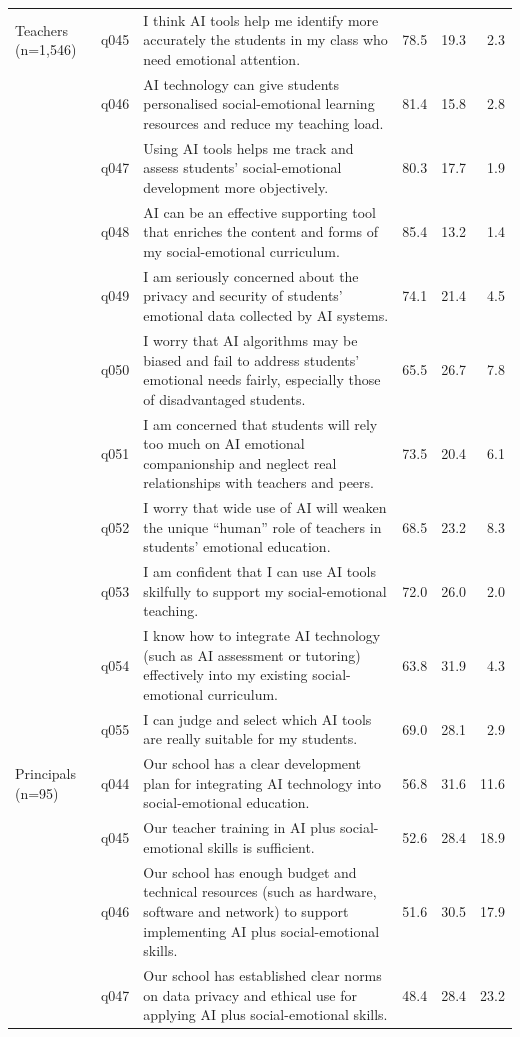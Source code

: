 \begin{longtable}{@{}p{}l p{} rrr@{}}
Teachers (n=1,546) & q045 & I think AI tools help me identify more accurately the students in my class who need emotional attention. & 78.5 & 19.3 & 2.3 \\
 & q046 & AI technology can give students personalised social-emotional learning resources and reduce my teaching load. & 81.4 & 15.8 & 2.8 \\
 & q047 & Using AI tools helps me track and assess students' social-emotional development more objectively. & 80.3 & 17.7 & 1.9 \\
 & q048 & AI can be an effective supporting tool that enriches the content and forms of my social-emotional curriculum. & 85.4 & 13.2 & 1.4 \\
 & q049 & I am seriously concerned about the privacy and security of students' emotional data collected by AI systems. & 74.1 & 21.4 & 4.5 \\
 & q050 & I worry that AI algorithms may be biased and fail to address students' emotional needs fairly, especially those of disadvantaged students. & 65.5 & 26.7 & 7.8 \\
 & q051 & I am concerned that students will rely too much on AI emotional companionship and neglect real relationships with teachers and peers. & 73.5 & 20.4 & 6.1 \\
 & q052 & I worry that wide use of AI will weaken the unique ``human'' role of teachers in students' emotional education. & 68.5 & 23.2 & 8.3 \\
 & q053 & I am confident that I can use AI tools skilfully to support my social-emotional teaching. & 72.0 & 26.0 & 2.0 \\
 & q054 & I know how to integrate AI technology (such as AI assessment or tutoring) effectively into my existing social-emotional curriculum. & 63.8 & 31.9 & 4.3 \\
 & q055 & I can judge and select which AI tools are really suitable for my students. & 69.0 & 28.1 & 2.9 \\
Principals (n=95) & q044 & Our school has a clear development plan for integrating AI technology into social-emotional education. & 56.8 & 31.6 & 11.6 \\
 & q045 & Our teacher training in AI plus social-emotional skills is sufficient. & 52.6 & 28.4 & 18.9 \\
 & q046 & Our school has enough budget and technical resources (such as hardware, software and network) to support implementing AI plus social-emotional skills. & 51.6 & 30.5 & 17.9 \\
 & q047 & Our school has established clear norms on data privacy and ethical use for applying AI plus social-emotional skills. & 48.4 & 28.4 & 23.2 \\
\end{longtable}
